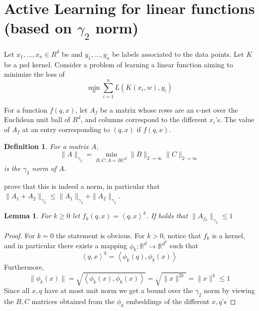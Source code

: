 \documentclass{article} %
\newtheorem{lemma}[theorem]{Lemma}
\newcommand{\ip}[1]{\left \langle #1 \right \rangle}
\newcommand{\R}{\mathbb{R}}
\newcommand{\eps}{\epsilon}
\newtheorem{definition}{Definition}
\begin{document}
%
%
%
%


\section{Active Learning for linear functions (based on $\gamma_2$ norm)}

Let $x_1,\ldots,x_n \in R^d$ be and $y_1,\ldots,y_n$ be labels associated to the data points. Let $K$ be a psd kernel. Consider a problem of learning a linear function aiming to minimize the loss of 
$$\min_w \sum_{i=1}^n L(K(x_i, w), y_i)$$

For a function $f(q,x)$, let $A_f$ be a matrix whose rows are an $\eps$-net over the Euclidean unit ball of $R^d$, and columns correspond to the different $x_i$'s. The value of $A_f$ at an entry corresponding to $(q,x)$ if $f(q,x)$.

\begin{definition}
For a matrix $A$,
$$ \|A\|_{\gamma_2} = \min_{B,C: A=BC^T} \|B\|_{2 \to \infty} \|C\|_{2 \to \infty}$$
is the $\gamma_2$ norm of $A$. 
\end{definition}
 \cite{tomczak1989banach} prove that this is indeed a norm, in particular that 
 $\|A_1+A_2\|_{\gamma_2} \leq \|A_1\|_{\gamma_2} + \|A_2\|_{\gamma_2}$. 


\begin{lemma} \label{lem:powers}
For $k \geq 0$ let $f_k(q,x) = \ip{q,x}^k$. If holds that $\|A_{f_k}\|_{\gamma_2} \leq 1$
\end{lemma}
\begin{proof}
For $k=0$ the statement is obvious. For $k>0$, notice that $f_k$ is a kernel, and in particular there exists a mapping $\phi_k: \R^d \to \R^{d^k}$ such that
$$ \ip{q,x}^k = \ip{\phi_k(q), \phi_k(x)} $$
Furthermore, 
$$ \|\phi_k(x)\| = \sqrt{\ip{\phi_k(x), \phi_k(x)}} = \sqrt{\|x\|^{2k}} = \|x\|^k \leq 1 $$
Since all $x,q$ have at most unit norm we get a bound over the $\gamma_2$ norm by viewing the $B,C$ matrices obtained from the $\phi_k$ embeddings of the different $x,q$'s
\end{proof}
\end{document}
